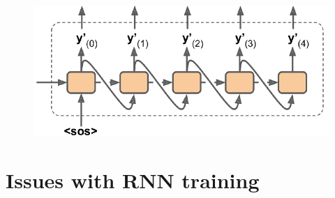 \begin{figure}[h]
    \centering
    \includegraphics[scale=0.6]{img/sentence_genesis.png}
\end{figure}

\section{Issues with RNN training}

